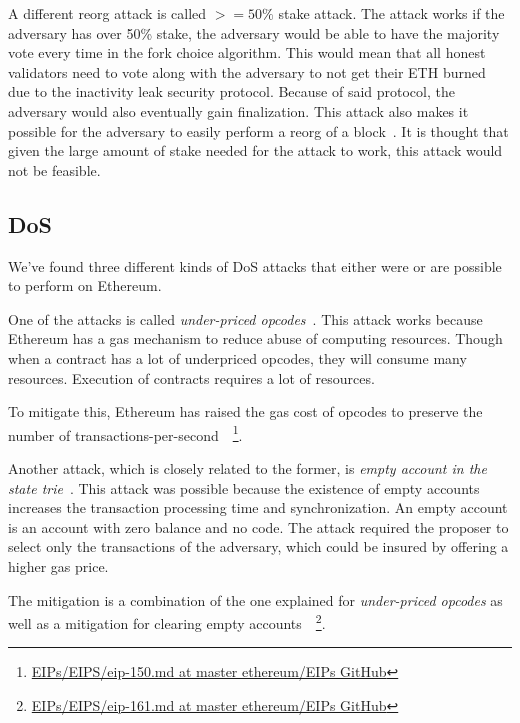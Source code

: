 A different reorg attack is called $>=50\%$ stake attack.
The attack works if the adversary has over 50\% stake, the adversary would be able to have the majority vote every time in the fork choice algorithm.
This would mean that all honest validators need to vote along with the adversary to not get their ETH burned due to the inactivity leak security protocol.
Because of said protocol, the adversary would also eventually gain finalization.
This attack also makes it possible for the adversary to easily perform a reorg of a block~\cite{EthereumAttackDefense2024}.
It is thought that given the large amount of stake needed for the attack to work, this attack would not be feasible.



\subsection{DoS}\label{subsec:dos}
We've found three different kinds of DoS attacks that either were or are possible to perform on Ethereum.

One of the attacks is called \textit{under-priced opcodes}~\cite{10.1145/3391195,9815256}.
This attack works because Ethereum has a gas mechanism to reduce abuse of computing resources.
Though when a contract has a lot of underpriced opcodes, they will consume many resources.
Execution of contracts requires a lot of resources.

To mitigate this,
Ethereum has raised the gas cost of opcodes
to preserve the number of transactions-per-second~\cite{Opcode-mitigation}~\footnote{
\href{https://github.com/ethereum/EIPs/blob/master/EIPS/eip-150.md}{EIPs/EIPS/eip-150.md at master ethereum/EIPs GitHub}}.

Another attack,
which is closely related to the former, is \textit{empty account in the state trie}~\cite{10.1145/3391195,9815256}.
This attack was possible
because the existence of empty accounts increases the transaction processing time and synchronization.
An empty account is an account with zero balance and no code.
The attack required the proposer to select only the transactions of the adversary,
which could be insured by offering a higher gas price.

The mitigation is a combination of the one
explained for \textit{under-priced opcodes} as well as a mitigation
for clearing empty accounts~\cite{Opcode-mitigation,empty-account-mitigation,empty-account-eip-mitigation}~\footnote{
\href{https://github.com/ethereum/EIPs/blob/master/EIPS/eip-161.md}{EIPs/EIPS/eip-161.md at master ethereum/EIPs GitHub}}.


